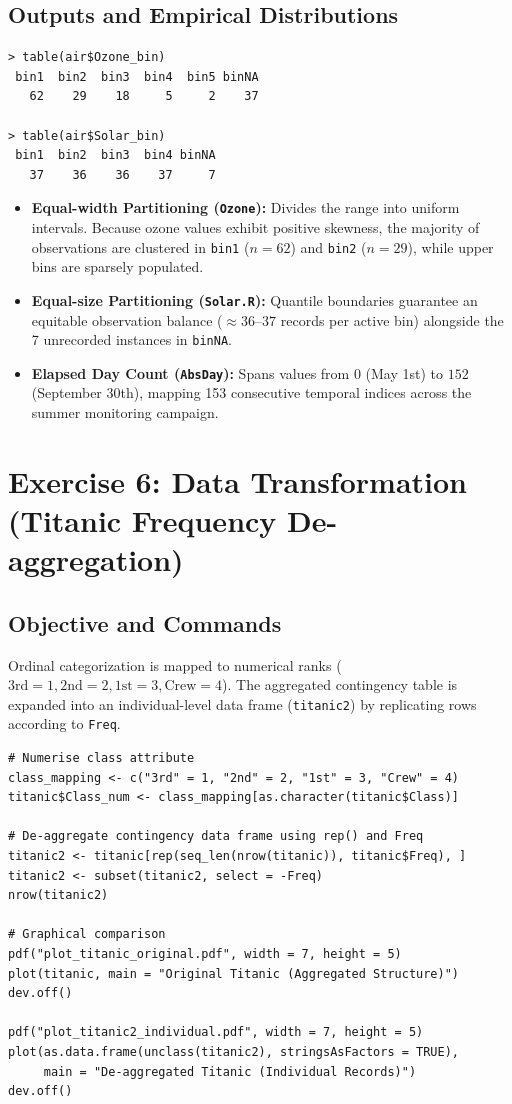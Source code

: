 \documentclass[11pt,a4paper]{article}
\begin{document}
\subsection{Outputs and Empirical Distributions}
\begin{lstlisting}[language={}]
> table(air$Ozone_bin)
 bin1  bin2  bin3  bin4  bin5 binNA 
   62    29    18     5     2    37 

> table(air$Solar_bin)
 bin1  bin2  bin3  bin4 binNA 
   37    36    36    37     7 
\end{lstlisting}
\begin{itemize}
    \item \textbf{Equal-width Partitioning (\texttt{Ozone}):} Divides the range into uniform intervals. Because ozone values exhibit positive skewness, the majority of observations are clustered in \texttt{bin1} ($n=62$) and \texttt{bin2} ($n=29$), while upper bins are sparsely populated.
    \item \textbf{Equal-size Partitioning (\texttt{Solar.R}):} Quantile boundaries guarantee an equitable observation balance ($\approx 36$--$37$ records per active bin) alongside the 7 unrecorded instances in \texttt{binNA}.
    \item \textbf{Elapsed Day Count (\texttt{AbsDay}):} Spans values from $0$ (May 1st) to $152$ (September 30th), mapping 153 consecutive temporal indices across the summer monitoring campaign.
\end{itemize}

\section{Exercise 6: Data Transformation (Titanic Frequency De-aggregation)}

\subsection{Objective and Commands}
Ordinal categorization is mapped to numerical ranks ($\text{3rd}=1, \text{2nd}=2, \text{1st}=3, \text{Crew}=4$). The aggregated contingency table is expanded into an individual-level data frame (\texttt{titanic2}) by replicating rows according to \texttt{Freq}.

\begin{lstlisting}
# Numerise class attribute
class_mapping <- c("3rd" = 1, "2nd" = 2, "1st" = 3, "Crew" = 4)
titanic$Class_num <- class_mapping[as.character(titanic$Class)]

# De-aggregate contingency data frame using rep() and Freq
titanic2 <- titanic[rep(seq_len(nrow(titanic)), titanic$Freq), ]
titanic2 <- subset(titanic2, select = -Freq)
nrow(titanic2)

# Graphical comparison
pdf("plot_titanic_original.pdf", width = 7, height = 5)
plot(titanic, main = "Original Titanic (Aggregated Structure)")
dev.off()

pdf("plot_titanic2_individual.pdf", width = 7, height = 5)
plot(as.data.frame(unclass(titanic2), stringsAsFactors = TRUE),
     main = "De-aggregated Titanic (Individual Records)")
dev.off()
\end{lstlisting}
\end{document}
